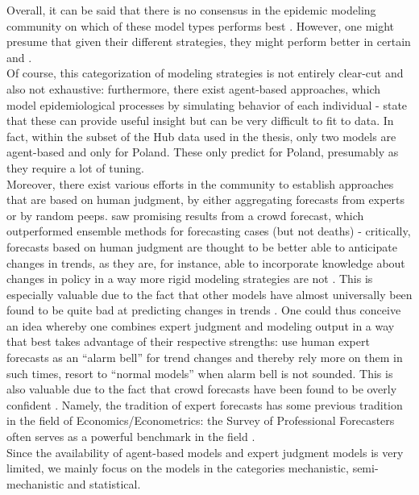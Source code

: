 Overall, it can be said that there is no consensus in the epidemic modeling community on which of these model types performs best \cite{moran_epidemic_2016}. However, one might presume that given their different strategies, they might perform better in certain and .  \\
Of course, this categorization of modeling strategies is not entirely clear-cut and also not  exhaustive: furthermore, there exist agent-based approaches, which model epidemiological processes by simulating behavior of each individual - \cite{zelner_accounting_2021} state that these can provide useful insight but can be very difficult to fit to data. In fact, within the subset of the Hub data used in the thesis, only two models are agent-based and only for Poland. These only predict for Poland, presumably as they require a lot of tuning. \\
Moreover, there exist various efforts in the community to establish approaches that are based on human judgment, by either aggregating forecasts from experts or by random peeps. \cite{bosse_comparing_2021-1} saw promising results from a crowd forecast, which outperformed ensemble methods for forecasting cases (but not deaths) - critically, forecasts based on human judgment are thought to be better able to anticipate changes in trends, as they are, for instance, able to incorporate knowledge about changes in policy in a way more rigid modeling strategies are not \cite{bracher_evaluating_2021}. This is especially valuable due to the fact that other models have almost universally been found to be quite bad at predicting changes in trends . One could thus conceive an idea whereby one combines expert judgment and modeling output in a way that best takes advantage of their respective strengths: use human expert forecasts as an ``alarm bell'' for trend changes and thereby rely more on them in such times, resort to ``normal models'' when alarm bell is not sounded. This is also valuable due to the fact that crowd forecasts have been found to be overly confident \cite{bosse_comparing_2021-1}. Namely, the tradition of expert forecasts has some previous tradition in the field of Economics/Econometrics: the Survey of Professional Forecasters often serves as a powerful benchmark in the field \citep{faust_forecasting_2013}.\\
Since the availability of agent-based models and expert judgment models is very limited, we mainly focus on the models in the categories mechanistic, semi-mechanistic and statistical. \\
